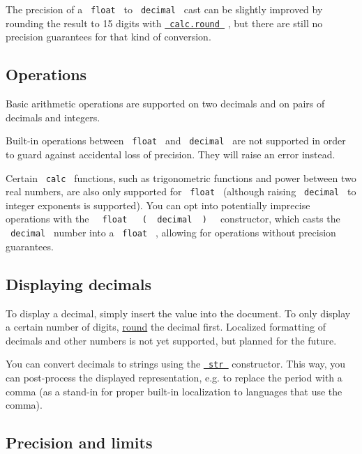The precision of a \texttt{\ float\ } to \texttt{\ decimal\ } cast can
be slightly improved by rounding the result to 15 digits with
\href{/docs/reference/foundations/calc/\#functions-round}{\texttt{\ calc.round\ }}
, but there are still no precision guarantees for that kind of
conversion.

\subsection{Operations}\label{operations}

Basic arithmetic operations are supported on two decimals and on pairs
of decimals and integers.

Built-in operations between \texttt{\ float\ } and \texttt{\ decimal\ }
are not supported in order to guard against accidental loss of
precision. They will raise an error instead.

Certain \texttt{\ calc\ } functions, such as trigonometric functions and
power between two real numbers, are also only supported for
\texttt{\ float\ } (although raising \texttt{\ decimal\ } to integer
exponents is supported). You can opt into potentially imprecise
operations with the
\texttt{\ }{\texttt{\ float\ }}\texttt{\ }{\texttt{\ (\ }}\texttt{\ decimal\ }{\texttt{\ )\ }}\texttt{\ }
constructor, which casts the \texttt{\ decimal\ } number into a
\texttt{\ float\ } , allowing for operations without precision
guarantees.

\subsection{Displaying decimals}\label{displaying-decimals}

To display a decimal, simply insert the value into the document. To only
display a certain number of digits,
\href{/docs/reference/foundations/calc/\#functions-round}{round} the
decimal first. Localized formatting of decimals and other numbers is not
yet supported, but planned for the future.

You can convert decimals to strings using the
\href{/docs/reference/foundations/str/}{\texttt{\ str\ }} constructor.
This way, you can post-process the displayed representation, e.g. to
replace the period with a comma (as a stand-in for proper built-in
localization to languages that use the comma).

\subsection{Precision and limits}\label{precision-and-limits}

